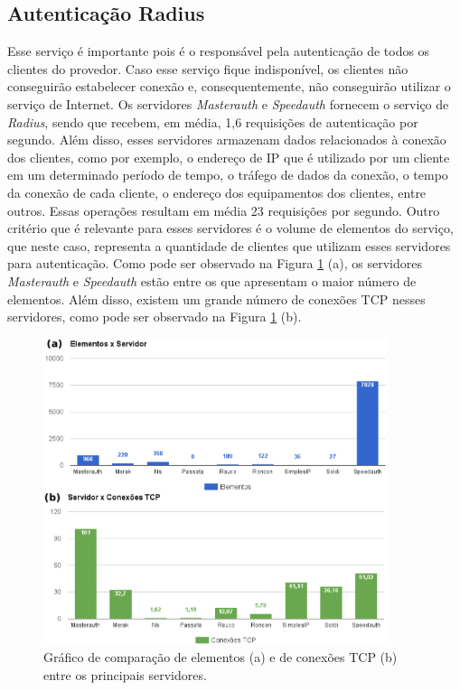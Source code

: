 \subsection{Autenticação Radius}
\label{section:radius}

Esse serviço é importante pois é o responsável pela autenticação de todos os clientes do provedor. Caso esse serviço fique indisponível, 
os clientes não conseguirão estabelecer conexão e, consequentemente, não conseguirão utilizar o serviço de Internet. Os servidores 
\textit{Masterauth} e \textit{Speedauth} fornecem o serviço de \textit{Radius}, sendo que recebem, em média, 1,6 requisições de autenticação 
por segundo. Além disso, esses servidores armazenam dados relacionados à conexão dos clientes, como por exemplo, o endereço de \ac{IP} que é 
utilizado por um cliente em um determinado período de tempo, o tráfego de dados da conexão, o tempo da conexão de cada cliente, o endereço 
 dos equipamentos dos clientes, entre outros. Essas operações resultam em média 23 requisições por segundo. 
Outro critério que é relevante para esses servidores é o volume de elementos do serviço, que neste caso, representa a quantidade de clientes que
utilizam esses servidores para autenticação. Como pode ser observado na Figura \ref{fig:elementos_tcp} (a), os servidores \textit{Masterauth} e 
\textit{Speedauth} estão entre os que apresentam o maior número de elementos. Além disso, existem um grande número de conexões \ac{TCP} nesses 
servidores, como pode ser observado na Figura \ref{fig:elementos_tcp} (b).


\begin{figure}[h!]
 \centering
 \includegraphics[width=380px]{img/elementos_tcp.eps}
 \caption{Gráfico de comparação de elementos (a) e de conexões TCP (b) entre os principais servidores.}
 \label{fig:elementos_tcp}
\end{figure}

